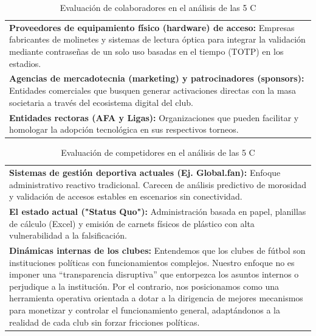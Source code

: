 \begin{table}[h!]
\centering
\renewcommand{\arraystretch}{1.5}
\begin{tabularx}{\textwidth}{|X|}
\hline
\rowcolor{green!20} \multicolumn{1}{|c|}{\textbf{COLABORADORES}} \\ \hline
\textbf{Proveedores de equipamiento físico (hardware) de acceso:} Empresas fabricantes de molinetes y sistemas de lectura óptica para integrar la validación mediante contraseñas de un solo uso basadas en el tiempo (TOTP) en los estadios. \\
\textbf{Agencias de mercadotecnia (marketing) y patrocinadores (sponsors):} Entidades comerciales que busquen generar activaciones directas con la masa societaria a través del ecosistema digital del club. \\
\textbf{Entidades rectoras (AFA y Ligas):} Organizaciones que pueden facilitar y homologar la adopción tecnológica en sus respectivos torneos. \\ \hline
\end{tabularx}
\caption{Evaluación de colaboradores en el análisis de las 5 C}
\end{table}

\newpage

\begin{table}[h!]
\centering
\renewcommand{\arraystretch}{1.5}
\begin{tabularx}{\textwidth}{|X|}
\hline
\rowcolor{orange!20} \multicolumn{1}{|c|}{\textbf{COMPETIDORES}} \\ \hline
\textbf{Sistemas de gestión deportiva actuales (Ej. Global.fan):} Enfoque administrativo reactivo tradicional. Carecen de análisis predictivo de morosidad y validación de accesos estables en escenarios sin conectividad. \\
\textbf{El estado actual ("Status Quo"):} Administración basada en papel, planillas de cálculo (Excel) y emisión de carnets físicos de plástico con alta vulnerabilidad a la falsificación. \\
\textbf{Dinámicas internas de los clubes:} Entendemos que los clubes de fútbol son instituciones políticas con funcionamientos complejos. Nuestro enfoque no es imponer una “transparencia disruptiva” que entorpezca los asuntos internos o perjudique a la institución. Por el contrario, nos posicionamos como una herramienta operativa orientada a dotar a la dirigencia de mejores mecanismos para monetizar y controlar el funcionamiento general, adaptándonos a la realidad de cada club sin forzar fricciones políticas. \\ \hline
\end{tabularx}
\caption{Evaluación de competidores en el análisis de las 5 C}
\end{table}

